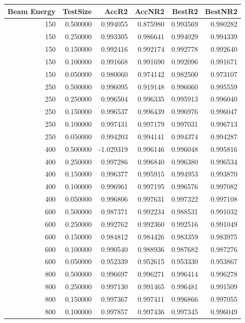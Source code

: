 \begin{tabular}{rrrrrr}
\toprule
Beam Energy & TestSize & AccR2 & AccNR2 & BestR2 & BestNR2 \\
\midrule
150 & 0.500000 & 0.994055 & 0.875980 & 0.993569 & 0.980282 \\
150 & 0.250000 & 0.993305 & 0.986641 & 0.994029 & 0.994339 \\
150 & 0.150000 & 0.992416 & 0.992174 & 0.992778 & 0.992640 \\
150 & 0.100000 & 0.991668 & 0.991690 & 0.992096 & 0.991671 \\
150 & 0.050000 & 0.980060 & 0.974142 & 0.982500 & 0.973107 \\
250 & 0.500000 & 0.996095 & 0.919148 & 0.996060 & 0.995559 \\
250 & 0.250000 & 0.996504 & 0.996335 & 0.995913 & 0.996040 \\
250 & 0.150000 & 0.996537 & 0.996439 & 0.996976 & 0.996047 \\
250 & 0.100000 & 0.997431 & 0.997179 & 0.997031 & 0.996713 \\
250 & 0.050000 & 0.994203 & 0.994141 & 0.994374 & 0.994287 \\
400 & 0.500000 & -1.029319 & 0.996146 & 0.996048 & 0.995816 \\
400 & 0.250000 & 0.997286 & 0.996840 & 0.996380 & 0.996534 \\
400 & 0.150000 & 0.996377 & 0.995915 & 0.994953 & 0.993870 \\
400 & 0.100000 & 0.996961 & 0.997195 & 0.996576 & 0.997082 \\
400 & 0.050000 & 0.996806 & 0.997631 & 0.997322 & 0.997108 \\
600 & 0.500000 & 0.987371 & 0.992234 & 0.988531 & 0.991032 \\
600 & 0.250000 & 0.992762 & 0.992360 & 0.992516 & 0.991049 \\
600 & 0.150000 & 0.984812 & 0.984426 & 0.983359 & 0.983975 \\
600 & 0.100000 & 0.990540 & 0.988936 & 0.987682 & 0.987276 \\
600 & 0.050000 & 0.952339 & 0.952615 & 0.953330 & 0.953867 \\
800 & 0.500000 & 0.996697 & 0.996271 & 0.996414 & 0.996278 \\
800 & 0.250000 & 0.997130 & 0.991465 & 0.996481 & 0.991509 \\
800 & 0.150000 & 0.997367 & 0.997411 & 0.996866 & 0.997055 \\
800 & 0.100000 & 0.997857 & 0.997436 & 0.997345 & 0.996049 \\

\end{tabular}
